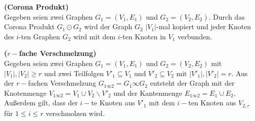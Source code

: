 \begin{defi}{\textbf{(Corona Produkt)}}\\
Gegeben seien zwei Graphen $G_1=(V_1,E_1)$ und $G_2=(V_2,E_2)$. Durch das Corona Produkt $G_1 \odot G_2$ wird der Graph $G_2$ $|V_1|$-mal kopiert und jeder Knoten des $i$-ten Graphen $G_2$ wird mit dem $i$-ten Knoten in $V_1$ verbunden.
\end{defi}

\begin{defi}{\textbf{($r-$fache Verschmelzung)}}\\
Gegeben seien zwei Graphen $G_1=(V_1,E_1)$ und $G_2=(V_2,E_2)$ mit $|V_1|, |V_2| \geq r$ und zwei Teilfolgen $V'_{1} \subseteq V_1$ und $V'_{2} \subseteq V_2$ mit $|V'_{1}|, |V'_{2}| = r$. Aus der $r-$fachen Verschmelzung $G_{1 \infty 2}=G_1 \infty G_2$ entsteht der Graph mit der Knotenmenge $V_{1 \infty 2}=V_1 \cup V_2\backslash V'_{2}$ und der Kantenmenge $E_{1\infty 2}= E_1 \cup E_2$. Außerdem gilt, dass der $i-$te Knoten aus $V'_{1}$ mit dem $i-$ten Knoten aus $V_{2,r}$ für $1 \leq i \leq r$ verschmolzen wird. 
\end{defi}

